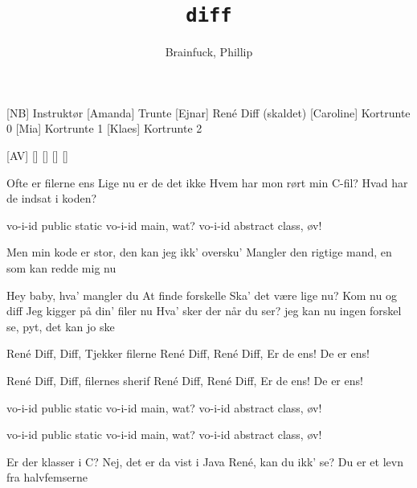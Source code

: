 \documentclass[a4paper,11pt]{article}
\title{\texttt{diff}}
\author{Brainfuck, Phillip}
\begin{document}
\maketitle

\begin{roles}
[NB] Instruktør
[Amanda] Trunte
[Ejnar] René Diff (skaldet)
[Caroline] Kortrunte 0
[Mia] Kortrunte 1
[Klaes] Kortrunte 2
\end{roles}

\begin{props}
[AV]
[]
[]
[]
[]
\end{props}

\begin{song}

 Ofte er filerne ens
Lige nu er de det ikke
Hvem har mon rørt min C-fil?
Hvad har de indsat i koden?


 vo-i-id public static
vo-i-id main, wat?
vo-i-id abstract class, øv!

 Men min kode er stor,
den kan jeg ikk' oversku'
Mangler den rigtige mand,
en som kan redde mig nu


 Hey baby, hva' mangler du
 At finde forskelle
 Ska' det være lige nu?
 Kom nu og diff
 Jeg kigger på din' filer nu
 Hva' sker der når du ser?
 jeg kan nu ingen forskel se, pyt, det kan jo ske

 René Diff, Diff,
Tjekker filerne
René Diff, René Diff,
Er de ens!
 De er ens!

 René Diff, Diff,
filernes sherif
René Diff, René Diff,
Er de ens!
 De er ens!

 vo-i-id public static
vo-i-id main, wat?
vo-i-id abstract class, øv!

 vo-i-id public static
vo-i-id main, wat?
vo-i-id abstract class, øv!

 Er der klasser i C?
Nej, det er da vist i Java
René, kan du ikk' se?
Du er et levn fra halvfemserne



\end{song}
\end{document}
